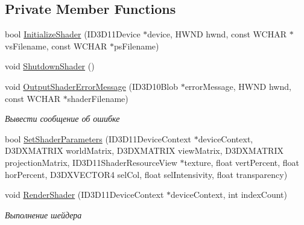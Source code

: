 \subsection*{Private Member Functions}
\begin{DoxyCompactItemize}
\item 
bool \hyperlink{class_interface_shader_class_a1f48fcd375215dd1200acd1fa87a00f4}{Initialize\+Shader} (I\+D3\+D11\+Device $\ast$device, H\+W\+ND hwnd, const W\+C\+H\+AR $\ast$vs\+Filename, const W\+C\+H\+AR $\ast$ps\+Filename)
\item 
void \hyperlink{class_interface_shader_class_a0caea9f0860ed2f391021d926062ede1}{Shutdown\+Shader} ()
\item 
void \hyperlink{class_interface_shader_class_a30f2ec589c49260602f14829156c673e}{Output\+Shader\+Error\+Message} (I\+D3\+D10\+Blob $\ast$error\+Message, H\+W\+ND hwnd, const W\+C\+H\+AR $\ast$shader\+Filename)
\begin{DoxyCompactList}\small\item\em Вывести сообщение об ошибке \end{DoxyCompactList}\item 
bool \hyperlink{class_interface_shader_class_a3b21898fd4fc443f42bad2976f0604dc}{Set\+Shader\+Parameters} (I\+D3\+D11\+Device\+Context $\ast$device\+Context, D3\+D\+X\+M\+A\+T\+R\+IX world\+Matrix, D3\+D\+X\+M\+A\+T\+R\+IX view\+Matrix, D3\+D\+X\+M\+A\+T\+R\+IX projection\+Matrix, I\+D3\+D11\+Shader\+Resource\+View $\ast$texture, float vert\+Percent, float hor\+Percent, D3\+D\+X\+V\+E\+C\+T\+O\+R4 sel\+Col, float sel\+Intensivity, float transparency)
\item 
void \hyperlink{class_interface_shader_class_a454f5ee070e775eb31c483ae2e227b89}{Render\+Shader} (I\+D3\+D11\+Device\+Context $\ast$device\+Context, int index\+Count)
\begin{DoxyCompactList}\small\item\em Выполнение шейдера \end{DoxyCompactList}\end{DoxyCompactItemize}

